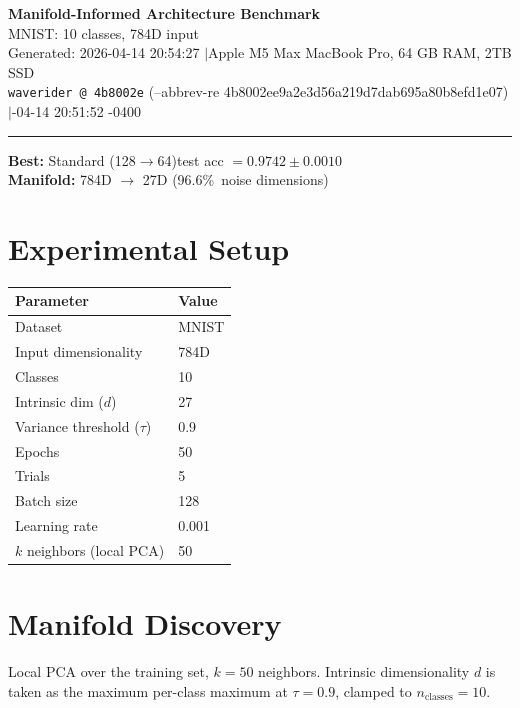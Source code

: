 \documentclass[11pt,letterpaper]{article}
\begin{document}
\begin{center}
  {\LARGE\bfseries\color{wavblue} Manifold-Informed Architecture Benchmark}\\[6pt]
  {\large MNIST: 10 classes, 784D input}\\[8pt]
  {\small Generated: 2026-04-14 20:54:27 \quad$|$\quad Apple M5 Max MacBook Pro, 64 GB RAM, 2TB SSD}\\[2pt]
  {\small\texttt{waverider @ 4b8002e} (--abbrev-re
4b8002ee9a2e3d56a219d7dab695a80b8efd1e07) \quad$|$-04-14 20:51:52 -0400}
\end{center}
{\color{wavblue}\noindent\rule{\linewidth}{1.5pt}}
\medskip

\noindent\colorbox{wavlight}{\parbox{\dimexpr\linewidth-2\fboxsep\relax}{
  \smallskip
  \textbf{Best:} Standard (128$\rightarrow$64)\quad test acc $= 0.9742 \pm 0.0010$\\[2pt]
  \textbf{Manifold:} 784D $\rightarrow$ 27D (96.6\%\ noise dimensions)\\[2pt]
  \smallskip
}}
\bigskip

\section{Experimental Setup}

\begin{tabular}{@{}ll@{}}
\toprule
\textbf{Parameter} & \textbf{Value} \\
\midrule
  Dataset & MNIST \\
  Input dimensionality & 784D \\
  Classes & 10 \\
  Intrinsic dim ($d$) & 27 \\
  Variance threshold ($\tau$) & 0.9 \\
  Epochs & 50 \\
  Trials & 5 \\
  Batch size & 128 \\
  Learning rate & 0.001 \\
  $k$ neighbors (local PCA) & 50 \\
\bottomrule
\end{tabular}

\section{Manifold Discovery}

Local PCA over the training set, $k = 50$ neighbors. Intrinsic dimensionality $d$ is taken as the maximum per-class maximum at $\tau = 0.9$, clamped to $n_{\mathrm{classes}} = 10$.
\end{document}
